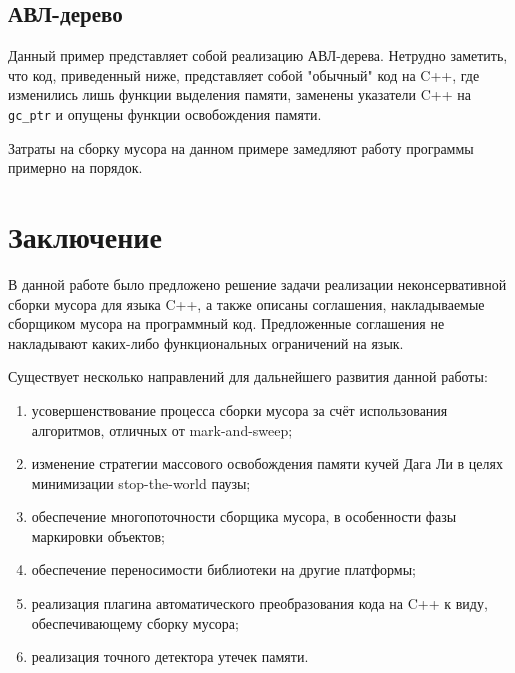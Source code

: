 \subsection{АВЛ-дерево}
Данный пример представляет собой реализацию АВЛ-дерева.
Нетрудно заметить, что код, приведенный ниже, представляет собой "обычный" код на C++, где
изменились лишь функции выделения памяти, заменены указатели C++ на \lstinline[language= cpp]{gc_ptr}
и опущены функции освобождения памяти.



Затраты на сборку мусора на данном примере замедляют работу программы примерно на порядок.

\section*{Заключение}

В данной работе было предложено решение задачи реализации неконсервативной сборки мусора для языка C++,
а также описаны соглашения, накладываемые сборщиком мусора на программный код.
Предложенные соглашения не накладывают каких-либо функциональных ограничений на язык.

Существует несколько направлений для дальнейшего развития данной работы:
\begin{enumerate}
\item усовершенствование процесса сборки мусора за счёт использования алгоритмов, отличных от mark-and-sweep;
\item изменение стратегии массового освобождения памяти кучей Дага Ли в целях минимизации stop-the-world паузы;
\item обеспечение многопоточности сборщика мусора, в особенности фазы маркировки объектов;
\item обеспечение переносимости библиотеки на другие платформы;
\item реализация плагина автоматического преобразования кода на C++ к виду, обеспечивающему сборку мусора;
\item реализация точного детектора утечек памяти.
\end{enumerate}

% 
% 

